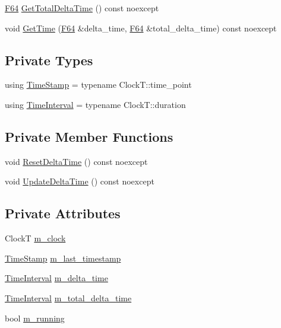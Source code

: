 \begin{DoxyCompactItemize}
\item 
\mbox{\hyperlink{namespacemage_ad26233bbec640deda836e572c1a23708}{F64}} \mbox{\hyperlink{classmage_1_1_timer_a4d67e33d559196d2d1ca1f75f12d5644}{Get\+Total\+Delta\+Time}} () const noexcept
\item 
void \mbox{\hyperlink{classmage_1_1_timer_a6ae023115c586f74e45bc9c9c4e7556b}{Get\+Time}} (\mbox{\hyperlink{namespacemage_ad26233bbec640deda836e572c1a23708}{F64}} \&delta\+\_\+time, \mbox{\hyperlink{namespacemage_ad26233bbec640deda836e572c1a23708}{F64}} \&total\+\_\+delta\+\_\+time) const noexcept
\end{DoxyCompactItemize}
\subsection*{Private Types}
\begin{DoxyCompactItemize}
\item 
using \mbox{\hyperlink{classmage_1_1_timer_abd11aea6107940b09ef3c48f62c81668}{Time\+Stamp}} = typename Clock\+T\+::time\+\_\+point
\item 
using \mbox{\hyperlink{classmage_1_1_timer_a5c0fd78ceab0110637622bd0e9b8424d}{Time\+Interval}} = typename Clock\+T\+::duration
\end{DoxyCompactItemize}
\subsection*{Private Member Functions}
\begin{DoxyCompactItemize}
\item 
void \mbox{\hyperlink{classmage_1_1_timer_ac39577316a032bce5b009401d67d406b}{Reset\+Delta\+Time}} () const noexcept
\item 
void \mbox{\hyperlink{classmage_1_1_timer_a05cbba0b368e49cdf4bfebfd840e4118}{Update\+Delta\+Time}} () const noexcept
\end{DoxyCompactItemize}
\subsection*{Private Attributes}
\begin{DoxyCompactItemize}
\item 
ClockT \mbox{\hyperlink{classmage_1_1_timer_ad46016090f9ae8a282398d8fcc8e9e0e}{m\+\_\+clock}}
\item 
\mbox{\hyperlink{classmage_1_1_timer_abd11aea6107940b09ef3c48f62c81668}{Time\+Stamp}} \mbox{\hyperlink{classmage_1_1_timer_a01e35b71a5fe5eebe3b05c1b675cb5ce}{m\+\_\+last\+\_\+timestamp}}
\item 
\mbox{\hyperlink{classmage_1_1_timer_a5c0fd78ceab0110637622bd0e9b8424d}{Time\+Interval}} \mbox{\hyperlink{classmage_1_1_timer_a9cb9bf6cd0f567a8a1fad02a89d98aa2}{m\+\_\+delta\+\_\+time}}
\item 
\mbox{\hyperlink{classmage_1_1_timer_a5c0fd78ceab0110637622bd0e9b8424d}{Time\+Interval}} \mbox{\hyperlink{classmage_1_1_timer_aa62b280ee2b58a3f75440cc4faf10b23}{m\+\_\+total\+\_\+delta\+\_\+time}}
\item 
bool \mbox{\hyperlink{classmage_1_1_timer_a195789c583eb8bd3b9f0058214b74bc5}{m\+\_\+running}}
\end{DoxyCompactItemize}


